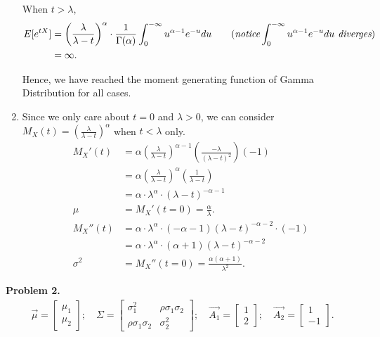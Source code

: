 \documentclass{article}
\begin{document}
\begin{enumerate}[label=(\alph*)]
    When $t > \lambda$,
    \begin{align}
        E[e^{tX}] & = \left(\frac{\lambda}{\lambda-t}\right)^\alpha \cdot \frac{1}{\Gamma (\alpha)}\int_{0}^{-\infty}u^{\alpha-1}e^{-u}du \nonumber \qquad (\emph{notice}\int_{0}^{-\infty}u^{\alpha-1}e^{-u}du \emph{ diverges})\\
        & = \infty. \nonumber
    \end{align}

    Hence, we have reached the moment generating function of Gamma Distribution for all cases.

    \item
    Since we only care about $t=0$ and $\lambda > 0$, we can consider $M_X(t) = \left(\frac{\lambda}{\lambda-t}\right)^\alpha$ when $t < \lambda$ only.
    \begin{align}
        M_X'(t) & = \alpha\left(\frac{\lambda}{\lambda-t}\right)^{\alpha-1}\left(\frac{-\lambda}{(\lambda-t)^2}\right)(-1) \nonumber \\
        & = \alpha\left(\frac{\lambda}{\lambda-t}\right)^{\alpha}\left(\frac{1}{\lambda-t}\right) \nonumber \\
        & = \alpha \cdot \lambda^\alpha\cdot(\lambda-t)^{-\alpha-1} \nonumber \\
        \mu & = M_X'(t=0) = \frac{\alpha}{\lambda}. \nonumber \\
        M_X''(t) & = \alpha \cdot \lambda^\alpha\cdot (-\alpha-1)(\lambda-t)^{-\alpha-2}\cdot(-1) \nonumber \\
        & = \alpha \cdot \lambda^\alpha\cdot (\alpha+1)(\lambda-t)^{-\alpha-2} \nonumber \\
        \sigma^2 & = M_X''(t=0) = \frac{\alpha(\alpha+1)}{\lambda^2}. \nonumber
    \end{align}
\end{enumerate}
\bigbreak

\textbf{Problem 2.} 
\begin{align}
    \vec{\mu}=
    \begin{bmatrix}
        \mu_1 \\
        \mu_2
    \end{bmatrix}; \quad
    \Sigma=
    \begin{bmatrix}
        \sigma_1^2 & \rho\sigma_1\sigma_2 \\
        \rho\sigma_1\sigma_2 & \sigma_2^2
    \end{bmatrix}; \quad
    \vec{A_1}=
    \begin{bmatrix}
        1 \\
        2 
    \end{bmatrix}; \quad
    \vec{A_2}=
    \begin{bmatrix}
        1 \\
        -1
    \end{bmatrix}. \nonumber
\end{align}
\end{document}
